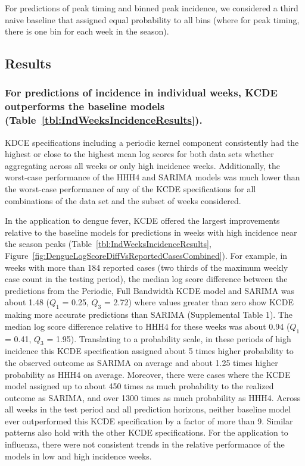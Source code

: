\documentclass[times, doublespace]{simauth}\usepackage[]{graphicx}\usepackage[]{color}
\begin{document}
For predictions of peak timing and binned peak incidence, we considered a third naive baseline
that assigned equal probability to all bins (where for peak timing, there is one bin for
each week in the season).

\subsection{Results}

\subsubsection{For predictions of incidence in individual weeks, KCDE
outperforms the baseline models (Table~\ref{tbl:IndWeeksIncidenceResults}).}
KDCE specifications including a periodic kernel component consistently had the
highest or close to the highest mean log scores for both data sets whether
aggregating across all weeks or only high incidence weeks.  Additionally, the
worst-case performance of the HHH4 and SARIMA models was much lower than the
worst-case performance of any of the KCDE specifications for all combinations of
the data set and the subset of weeks considered.








In the application to dengue fever, KCDE offered the largest improvements relative to the baseline models for predictions in weeks with high incidence near
the season peaks (Table~\ref{tbl:IndWeeksIncidenceResults}, Figure~\ref{fig:DengueLogScoreDiffVsReportedCasesCombined}).
For example, in weeks with more than 184 reported cases (two thirds of
the maximum weekly case count in the testing period), the median log score
difference between the predictions from the Periodic, Full Bandwidth KCDE model and SARIMA was about
1.48 ($Q_1$ = 0.25, $Q_3$ = 2.72)
where values greater than zero show KCDE making more accurate predictions than SARIMA (Supplemental Table 1).
The median log score difference relative to HHH4 for these weeks was about
0.94 ($Q_1$ = 0.41, $Q_3$ = 1.95).
Translating to a probability scale, in these periods of high incidence this KCDE
specification assigned about 5 times higher probability to the observed outcome
as SARIMA on average and about 1.25 times higher probability as HHH4 on average.
Moreover, there were cases where the KCDE model assigned up to about 450 times as much
probability to the realized outcome as SARIMA, and over 1300 times as much probability as HHH4.  Across all weeks in the test period and all prediction horizons, neither baseline model ever outperformed this KCDE specification by a factor of more than 9.
Similar patterns also hold with the other KCDE specifications.
For the application to influenza, there were not consistent trends in the relative performance of
the models in low and high incidence weeks.
\end{document}

